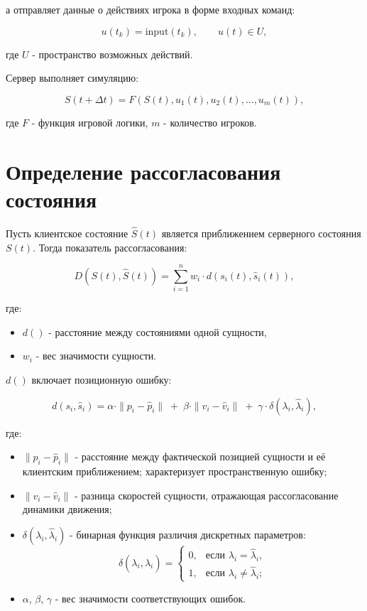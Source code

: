 а отправляет данные о действиях игрока в форме входных команд:

\[
u(t_k) = \text{input}(t_k), \qquad u(t) \in U,
\]

где $U$ - пространство возможных действий.

Сервер выполняет симуляцию:

\[
S(t + \Delta t) = F(S(t), u_1(t), u_2(t), \ldots, u_m(t)),
\]

где $F$ - функция игровой логики, $m$ - количество игроков.

\section{Определение рассогласования состояния}

Пусть клиентское состояние $\hat{S}(t)$ является приближением серверного состояния $S(t)$.
Тогда показатель рассогласования:

\[
D(S(t), \hat{S}(t)) = \sum_{i=1}^{n} w_i \cdot d(s_i(t), \hat{s}_i(t)),
\]

где:
\begin{itemize}
    \item $d()$ - расстояние между состояниями одной сущности,
    \item $w_i$ - вес значимости сущности.
\end{itemize}

$d()$ включает позиционную ошибку:

\[
d(s_i, \hat{s}_i) = 
    \alpha \cdot \|p_i - \hat{p}_i\| \;+\;
    \beta \cdot \|v_i - \hat{v}_i\|\;+\;
    \gamma \cdot \delta(\lambda_i, \hat{\lambda}_i),
\]

где:
\begin{itemize}
    \item $\|p_i - \hat{p}_i\|$ - расстояние между фактической позицией сущности 
    и её клиентским приближением; характеризует пространственную ошибку;
    \item $\|v_i - \hat{v}_i\|$ - разница скоростей сущности, отражающая рассогласование 
    динамики движения;
    \item $\delta(\lambda_i, \hat{\lambda}_i)$ - бинарная функция различия дискретных параметров:
    \[
        \delta(\lambda_i, \hat{\lambda}_i) =
        \begin{cases}
            0, & \text{если } \lambda_i = \hat{\lambda}_i,\\
            1, & \text{если } \lambda_i \neq \hat{\lambda}_i;
        \end{cases}
    \]
    \item $\alpha$, $\beta$, $\gamma$ - вес значимости соответствующих ошибок.
\end{itemize}


